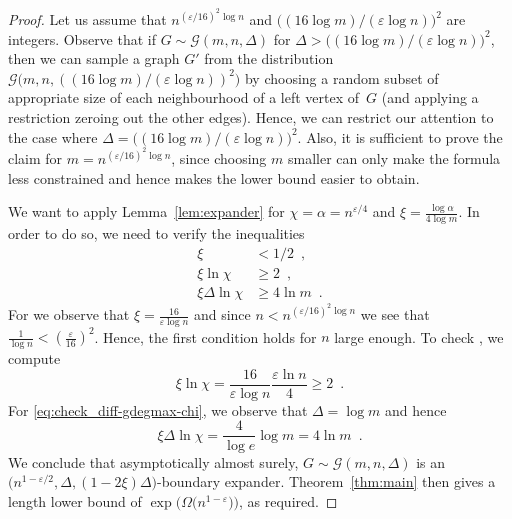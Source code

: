 \documentclass{article}
\newcommand{\eqperiod}{\enspace .}
\newcommand{\eqcomma}{\enspace ,}
\newcommand{\refthm}[1]{Theorem~\ref{#1}}
\newcommand{\reflem}[1]{Lemma~\ref{#1}}
\newcommand{\diff}{\xi}
\newcommand{\cdiff}{4}
\newcommand{\GdegMax}{\Delta}
\newcommand{\gdegmax}{\GdegMax}
\newcommand{\Gdist}{\mathcal{G}}
\newcommand{\constFPHPnew}{16}
\newcommand{\exponentalpha}{\varepsilon}
\numberwithin{equation}{section}
\begin{document}
\begin{proof}
  Let us assume that
  $n^{\left( \exponentalpha/\constFPHPnew \right)^2 \log n}$ and
  $\bigl( ({\constFPHPnew \log m}) / ({\exponentalpha \log n} )
  \bigr)^2$ are integers.  Observe that if
  $G \sim \Gdist \left(m,n,\GdegMax \right)$ for
  $\GdegMax > \bigl( ({\constFPHPnew \log m}) / ({\exponentalpha \log
    n}) \bigr)^2 $, then
  we can sample a graph
  $G'$ from the distribution $\Gdist 
  \bigl(m,n, ( 
      ({\constFPHPnew \log m}) / ({\exponentalpha \log n}) 
      )^2 \bigr)
  $
  by choosing a random subset of appropriate size of each neighbourhood
  of a left vertex of~$G$ (and applying a restriction zeroing out the other
  edges). 
  Hence, we can restrict our attention
  to the case where 
  $\GdegMax= 
  \bigl( ({\constFPHPnew \log m}) / ({\exponentalpha \log n}) \bigr)^2
  $.
  Also, it is sufficient to prove the claim for 
  $m = n^{\left( \exponentalpha/\constFPHPnew \right)^2 \log n}$,
  since choosing $m$ smaller can only make the formula less
  constrained and hence makes the lower bound easier to obtain.

  We want to apply \reflem{lem:expander} for 
  $\chi = \alpha = n^{\exponentalpha/4}$
  and
  $\diff = \frac{\log \alpha}{\cdiff \log m}$.
  In order to do so, we need to verify the inequalities
  \begin{subequations}
    \begin{align}
      \label{eq:check_diff}
      \diff &< 1/2 \eqcomma \\
      \label{eq:check_diff-chi}
      \diff \ln \chi &\geq 2 \eqcomma \\
      \label{eq:check_diff-gdegmax-chi}
      \diff \gdegmax \ln \chi &\geq 4 \ln m \eqperiod
    \end{align}
  \end{subequations}
  For  we observe that 
  $\diff = \frac{16}{\exponentalpha \log n}$
  and
  since
  $n < n^{\left(\exponentalpha/\constFPHPnew \right)^2 \log n}$
  we see that
  $\frac{1}{\log n} < \left(\frac{\exponentalpha}{\constFPHPnew}\right)^2$. 
  Hence, the first condition
  holds for $n$ large enough.
  To check , we compute
  \begin{equation}
    \diff \ln \chi 
    =
    \frac
    { 16  }
    { \varepsilon \log n}
    \frac{\varepsilon \ln n}{4}
    \ge 2 \eqperiod
  \end{equation}
  For
  \eqref{eq:check_diff-gdegmax-chi},
  we observe that $\gdegmax = \log m$ and hence
  \begin{equation}
    \diff \gdegmax \ln \chi 
    =
    \frac{4}{\log e} \log m
    =  4 \ln m  \eqperiod
  \end{equation}
  We conclude 
  that
  asymptotically almost surely,
  $G \sim \Gdist \left(m,n,\GdegMax \right)$ is an
  $\bigl( n^{1 - \exponentalpha/2}, \GdegMax, 
  (1 - 2 \diff)\GdegMax \bigr)$-boundary expander.
  \refthm{thm:main} then gives a length lower bound
  of $\exp\bigl( \Omega \bigl( n^{1 - \exponentalpha} \bigr) \bigr)$,
  as required.
\end{proof}
\end{document}
